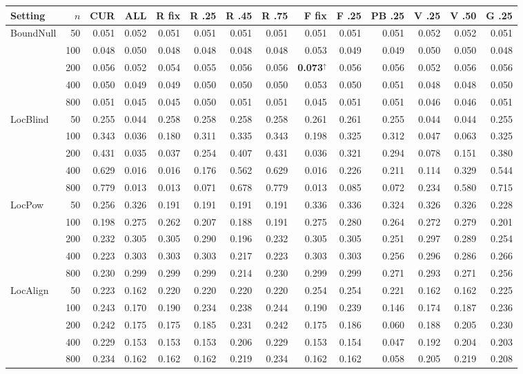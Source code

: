 \begin{tabular}{@{}lrrrrrrrrrrrrr@{}}
\toprule
Setting & $n$ & CUR & ALL & R fix & R .25 & R .45 & R .75 & F fix & F .25 & PB .25 & V .25 & V .50 & G .25\\
\midrule
BoundNull & 50 & 0.051 & 0.052 & 0.051 & 0.051 & 0.051 & 0.051 & 0.051 & 0.051 & 0.051 & 0.052 & 0.052 & 0.051\\
 & 100 & 0.048 & 0.050 & 0.048 & 0.048 & 0.048 & 0.048 & 0.053 & 0.049 & 0.049 & 0.050 & 0.050 & 0.048\\
 & 200 & 0.056 & 0.052 & 0.054 & 0.055 & 0.056 & 0.056 & \textbf{0.073}$^{\uparrow}$ & 0.056 & 0.056 & 0.052 & 0.056 & 0.056\\
 & 400 & 0.050 & 0.049 & 0.049 & 0.050 & 0.050 & 0.050 & 0.053 & 0.050 & 0.051 & 0.048 & 0.048 & 0.050\\
 & 800 & 0.051 & 0.045 & 0.045 & 0.050 & 0.051 & 0.051 & 0.045 & 0.051 & 0.051 & 0.046 & 0.046 & 0.051\\
\addlinespace[2pt]
LocBlind & 50 & 0.255 & 0.044 & 0.258 & 0.258 & 0.258 & 0.258 & 0.261 & 0.261 & 0.255 & 0.044 & 0.044 & 0.255\\
 & 100 & 0.343 & 0.036 & 0.180 & 0.311 & 0.335 & 0.343 & 0.198 & 0.325 & 0.312 & 0.047 & 0.063 & 0.325\\
 & 200 & 0.431 & 0.035 & 0.037 & 0.254 & 0.407 & 0.431 & 0.036 & 0.321 & 0.294 & 0.078 & 0.151 & 0.380\\
 & 400 & 0.629 & 0.016 & 0.016 & 0.176 & 0.562 & 0.629 & 0.016 & 0.226 & 0.211 & 0.114 & 0.329 & 0.544\\
 & 800 & 0.779 & 0.013 & 0.013 & 0.071 & 0.678 & 0.779 & 0.013 & 0.085 & 0.072 & 0.234 & 0.580 & 0.715\\
\addlinespace[2pt]
LocPow & 50 & 0.256 & 0.326 & 0.191 & 0.191 & 0.191 & 0.191 & 0.336 & 0.336 & 0.324 & 0.326 & 0.326 & 0.228\\
 & 100 & 0.198 & 0.275 & 0.262 & 0.207 & 0.188 & 0.191 & 0.275 & 0.280 & 0.264 & 0.272 & 0.279 & 0.201\\
 & 200 & 0.232 & 0.305 & 0.305 & 0.290 & 0.196 & 0.232 & 0.305 & 0.305 & 0.251 & 0.297 & 0.289 & 0.254\\
 & 400 & 0.223 & 0.303 & 0.303 & 0.303 & 0.217 & 0.223 & 0.303 & 0.303 & 0.256 & 0.296 & 0.286 & 0.266\\
 & 800 & 0.230 & 0.299 & 0.299 & 0.299 & 0.214 & 0.230 & 0.299 & 0.299 & 0.271 & 0.293 & 0.271 & 0.256\\
\addlinespace[2pt]
LocAlign & 50 & 0.223 & 0.162 & 0.220 & 0.220 & 0.220 & 0.220 & 0.254 & 0.254 & 0.221 & 0.162 & 0.162 & 0.225\\
 & 100 & 0.243 & 0.170 & 0.190 & 0.234 & 0.238 & 0.244 & 0.190 & 0.239 & 0.146 & 0.174 & 0.187 & 0.236\\
 & 200 & 0.242 & 0.175 & 0.175 & 0.185 & 0.231 & 0.242 & 0.175 & 0.186 & 0.060 & 0.188 & 0.205 & 0.230\\
 & 400 & 0.229 & 0.153 & 0.153 & 0.153 & 0.206 & 0.229 & 0.153 & 0.154 & 0.047 & 0.192 & 0.204 & 0.203\\
 & 800 & 0.234 & 0.162 & 0.162 & 0.162 & 0.219 & 0.234 & 0.162 & 0.162 & 0.058 & 0.205 & 0.219 & 0.208\\
\bottomrule
\end{tabular}